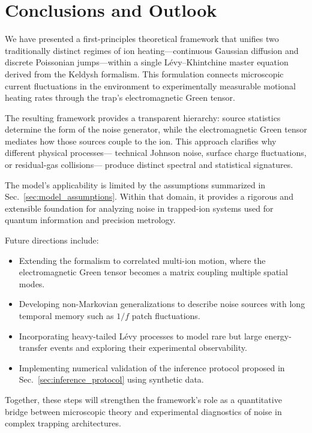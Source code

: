 \section{Conclusions and Outlook}
\label{sec:conclusion}

We have presented a first-principles theoretical framework that unifies
two traditionally distinct regimes of ion heating---continuous Gaussian diffusion
and discrete Poissonian jumps---within a single Lévy–Khintchine master equation
derived from the Keldysh formalism.
This formulation connects microscopic current fluctuations in the environment
to experimentally measurable motional heating rates through the trap's
electromagnetic Green tensor.

The resulting framework provides a transparent hierarchy:
source statistics determine the form of the noise generator,
while the electromagnetic Green tensor mediates how those sources couple to the ion.
This approach clarifies why different physical processes---
technical Johnson noise, surface charge fluctuations, or residual-gas collisions---
produce distinct spectral and statistical signatures.

The model's applicability is limited by the assumptions summarized in
Sec.~\ref{sec:model_assumptions}.
Within that domain, it provides a rigorous and extensible foundation
for analyzing noise in trapped-ion systems used for quantum information
and precision metrology.

Future directions include:
\begin{itemize}
  \item Extending the formalism to correlated multi-ion motion,
        where the electromagnetic Green tensor becomes a matrix coupling multiple spatial modes.
  \item Developing non-Markovian generalizations to describe noise sources
        with long temporal memory such as \(1/f\) patch fluctuations.
  \item Incorporating heavy-tailed Lévy processes to model rare but large
        energy-transfer events and exploring their experimental observability.
  \item Implementing numerical validation of the inference protocol
        proposed in Sec.~\ref{sec:inference_protocol} using synthetic data.
\end{itemize}

Together, these steps will strengthen the framework's role as a quantitative bridge
between microscopic theory and experimental diagnostics of noise
in complex trapping architectures.
